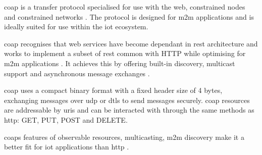 \acrfull{coap} is a transfer protocol specialised for use with the web, constrained
nodes and constrained networks \citep{shelby_constrained_2014}. The protocol is 
designed for \gls{m2m} applications and is ideally suited for use within the 
\gls{iot} ecosystem.

\gls{coap} recognises that web services have become dependant in \gls{rest} 
architecture and works to implement a subset of \gls{rest} common with HTTP while
optimising for \gls{m2m} applications \citep{shelby_constrained_2014}. It achieves 
this by offering built-in discovery, multicast support and asynchronous message 
exchanges \citep{shelby_constrained_2014}. 

\gls{coap} uses a compact binary format with a fixed header size of 4 bytes, 
exchanging messages over \gls{udp} or \gls{dtls} to send messages securely. \gls{coap} 
resources are addressable by \glspl{uri} and can be interacted with through the 
same methods as \gls{http}: GET, PUT, POST and DELETE.

\glspl{coap} features of observable resources, multicasting, \gls{m2m} discovery 
make it a better fit for \gls{iot} applications than \gls{http} \citep{kovatsch_californium:_2014}.